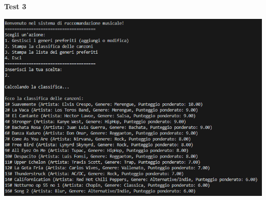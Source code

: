 \documentclass[a4paper,11pt]{article}
\begin{document}
    \begin{center}
        \textbf{Test 3}
        \par
        \vspace{0.5cm}
        \includegraphics[width=1\textwidth]{Immagini/Tests/ptest3}
    \end{center}
\end{document}
